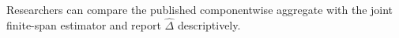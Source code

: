 Researchers can compare the published componentwise aggregate with the joint finite-span estimator and report \(\widehat\Delta\) descriptively.